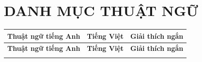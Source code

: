 \chapter*{DANH MỤC THUẬT NGỮ}

\renewcommand{\arraystretch}{1.25}
\begin{longtable}{
    >{\raggedright\arraybackslash}p{}
    >{\raggedright\arraybackslash}p{}
    >{\raggedright\arraybackslash}p{}
}
\toprule
\textbf{Thuật ngữ tiếng Anh} & \textbf{Tiếng Việt} & \textbf{Giải thích ngắn} \\
\midrule
\endfirsthead
\toprule
\textbf{Thuật ngữ tiếng Anh} & \textbf{Tiếng Việt} & \textbf{Giải thích ngắn} \\
\midrule
\endhead
\bottomrule
\endfoot


\end{longtable}

